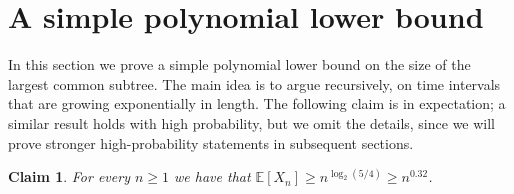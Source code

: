 \documentclass[11pt]{article}
\numberwithin{equation}{section}
\newcommand{\E}{\mathbb{E}} %
\newtheorem{claim}[theorem]{Claim}
\theoremstyle{definition}
\begin{document}

\section{A simple polynomial lower bound} \label{sec:polyLB} %

In this section we prove a simple polynomial lower bound on the size of the largest common subtree. 
The main idea is to argue recursively, on time intervals that are growing exponentially in length. 
The following claim is in expectation; 
a similar result holds with high probability, but we omit the details, since we will prove stronger high-probability statements in subsequent sections. 

\begin{claim}\label{claim:simple}
For every $n \geq 1$ we have that $\E \left[ X_{n} \right] \geq n^{\log_{2}(5/4)} \geq n^{0.32}$. 
\end{claim}
\end{document}

